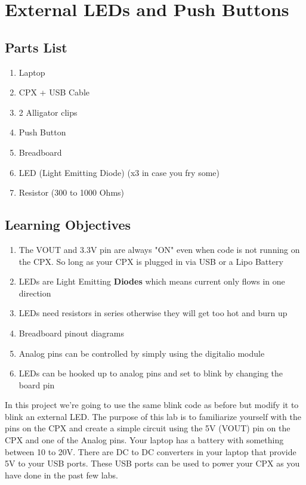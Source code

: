 \newpage

\section{External LEDs and Push Buttons}

\subsection{Parts List}

\begin{enumerate}[itemsep=-5pt]
  \item Laptop
  \item CPX + USB Cable
  \item 2 Alligator clips
  \item Push Button
  \item Breadboard
  \item LED (Light Emitting Diode) (x3 in case you fry some)
  \item Resistor (300 to 1000 Ohms)
\end{enumerate}

\subsection{Learning Objectives}

\begin{enumerate}[itemsep=-5pt]
\item The VOUT and 3.3V pin are always "ON" even when code is not
  running on the CPX. So long as your CPX is plugged in via USB or a
  Lipo Battery
\item LEDs are Light Emitting {\bf Diodes} which means current only flows in one direction
\item LEDs need resistors in series otherwise they will get too hot and burn up
\item Breadboard pinout diagrams
\item Analog pins can be controlled by simply using the digitalio module
\item LEDs can be hooked up to analog pins and set to blink by changing the board pin
\end{enumerate}

In this project we’re going to use the same blink code as before but
modify it to blink an external LED. The purpose of this lab is to
familiarize yourself with the pins on the CPX and create a simple
circuit using the 5V (VOUT) pin on the CPX and one of the Analog pins. Your
laptop has a battery with something between 10 to 20V. There are DC to
DC converters in your laptop that provide 5V to your USB ports. These
USB ports can be used to power your CPX as you have done in the past
few labs.

